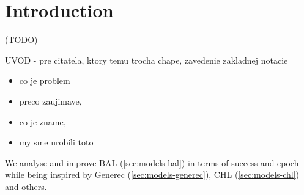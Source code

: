 







\section*{Introduction}
\label{sec:introduction} 


(TODO)

UVOD - pre citatela, ktory temu trocha chape, zavedenie zakladnej notacie 
\begin{itemize} 
\item   co je problem
\item   preco zaujimave,
\item   co je zname,
\item   my sme urobili toto
\end{itemize} 

We analyse and improve BAL (\ref{sec:models-bal}) in terms of success and epoch while being inspired by Generec (\ref{sec:models-generec}), CHL (\ref{sec:models-chl}) and others. 

